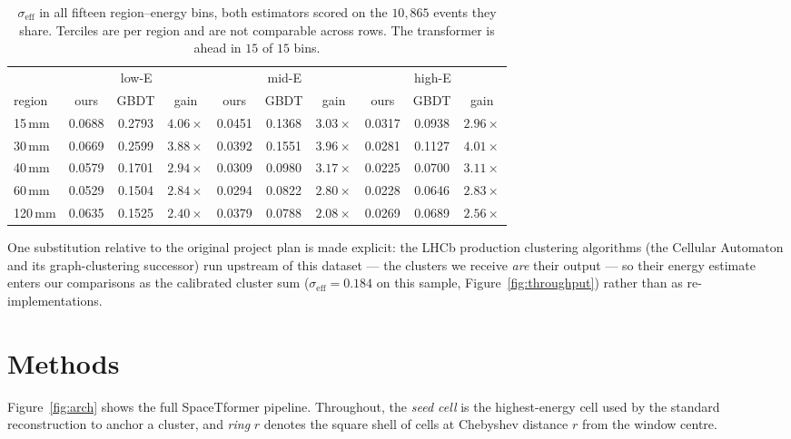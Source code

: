 \documentclass[11pt,a4paper]{article}
\newcommand{\seff}{\ensuremath{\sigma_{\mathrm{eff}}}}
\begin{document}
\begin{table}[h]
\centering
\caption{\seff{} in all fifteen region--energy bins, both estimators scored
on the $10{,}865$ events they share. Terciles are per region and are not
comparable across rows. The transformer is ahead in $15$ of $15$ bins.}
\label{tab:vsbdt}
\small
\setlength{\tabcolsep}{3.5pt}
\begin{tabular}{lccccccccc}
\toprule
& \multicolumn{3}{c}{low-E} & \multicolumn{3}{c}{mid-E} & \multicolumn{3}{c}{high-E}\\
\cmidrule(lr){2-4}\cmidrule(lr){5-7}\cmidrule(lr){8-10}
region & ours & GBDT & gain & ours & GBDT & gain & ours & GBDT & gain\\
\midrule
15\,mm & 0.0688 & 0.2793 & $4.06\times$ & 0.0451 & 0.1368 & $3.03\times$ & 0.0317 & 0.0938 & $2.96\times$\\
30\,mm & 0.0669 & 0.2599 & $3.88\times$ & 0.0392 & 0.1551 & $3.96\times$ & 0.0281 & 0.1127 & $4.01\times$\\
40\,mm & 0.0579 & 0.1701 & $2.94\times$ & 0.0309 & 0.0980 & $3.17\times$ & 0.0225 & 0.0700 & $3.11\times$\\
60\,mm & 0.0529 & 0.1504 & $2.84\times$ & 0.0294 & 0.0822 & $2.80\times$ & 0.0228 & 0.0646 & $2.83\times$\\
120\,mm & 0.0635 & 0.1525 & $2.40\times$ & 0.0379 & 0.0788 & $2.08\times$ & 0.0269 & 0.0689 & $2.56\times$\\
\bottomrule
\end{tabular}
\end{table} One substitution relative
to the original project plan is made explicit: the LHCb production
clustering algorithms (the Cellular Automaton and its graph-clustering
successor) run upstream of this dataset --- the clusters we receive
\emph{are} their output --- so their energy estimate enters our comparisons
as the calibrated cluster sum ($\seff = 0.184$ on this sample,
Figure~\ref{fig:throughput}) rather than as re-implementations.

\section{Methods}
\label{sec:methods}

Figure~\ref{fig:arch} shows the full SpaceTformer pipeline. Throughout, the
\emph{seed cell} is the highest-energy cell used by the standard
reconstruction to anchor a cluster, and \emph{ring} $r$ denotes the square
shell of cells at Chebyshev distance $r$ from the window centre.
\end{document}
